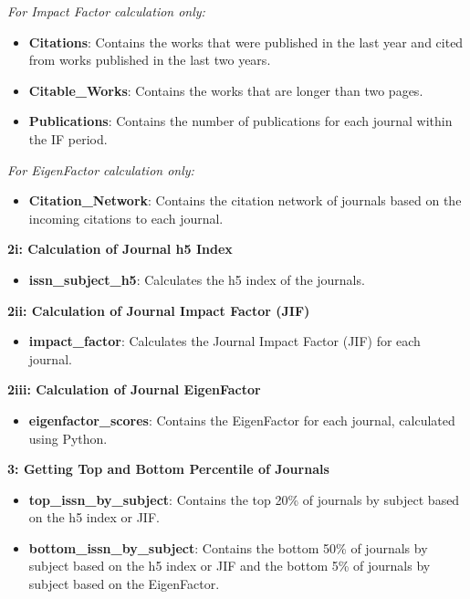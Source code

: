 \vspace{0.5em} %
\noindent\emph{For Impact Factor calculation only:}
\begin{itemize}
      \item \textbf{Citations}: Contains the works that were published in the last year and cited from works published in the last two years.
      \item \textbf{Citable\_Works}: Contains the works that are longer than two pages.
      \item \textbf{Publications}: Contains the number of publications for each journal within the IF period.
\end{itemize}

\vspace{0.5em} %
\noindent\emph{For EigenFactor calculation only:}
\begin{itemize}
      \item \textbf{Citation\_Network}: Contains the citation network of journals based on the incoming citations to each journal.
\end{itemize}

\noindent\textbf{2i: Calculation of Journal h5 Index}
\begin{itemize}
      \item \textbf{issn\_subject\_h5}: Calculates the h5 index of the journals.
\end{itemize}

\noindent\textbf{2ii: Calculation of Journal Impact Factor (JIF)}
\begin{itemize}
      \item \textbf{impact\_factor}: Calculates the Journal Impact Factor (JIF) for each journal.
\end{itemize}

\noindent\textbf{2iii: Calculation of Journal EigenFactor}
\begin{itemize}
      \item \textbf{eigenfactor\_scores}: Contains the EigenFactor for each journal, calculated using Python.
\end{itemize}

\noindent\textbf{3: Getting Top and Bottom Percentile of Journals}
\begin{itemize}
      \item \textbf{top\_issn\_by\_subject}: Contains the top 20\% of journals by subject based on the h5 index or JIF.
      \item \textbf{bottom\_issn\_by\_subject}: Contains the bottom 50\% of journals by subject based on the h5 index or JIF and the bottom 5\% of journals by subject based on the EigenFactor.
\end{itemize}


